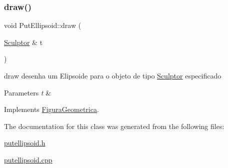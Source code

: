 \subsubsection{\texorpdfstring{draw()}{draw()}}
{\footnotesize\ttfamily void Put\+Ellipsoid\+::draw (\begin{DoxyParamCaption}\item[{\hyperlink{class_sculptor}{Sculptor} \&}]{t }\end{DoxyParamCaption})\hspace{0.3cm}{\ttfamily [virtual]}}



draw desenha um Elipsoide para o objeto de tipo \hyperlink{class_sculptor}{Sculptor} especificado 


\begin{DoxyParams}{Parameters}
{\em t} & \\
\hline
\end{DoxyParams}


Implements \hyperlink{class_figura_geometrica_a34585fd7c0bd7378fc69c4ee208e676c}{Figura\+Geometrica}.



The documentation for this class was generated from the following files\+:\begin{DoxyCompactItemize}
\item 
\hyperlink{putellipsoid_8h}{putellipsoid.\+h}\item 
\hyperlink{putellipsoid_8cpp}{putellipsoid.\+cpp}\end{DoxyCompactItemize}
